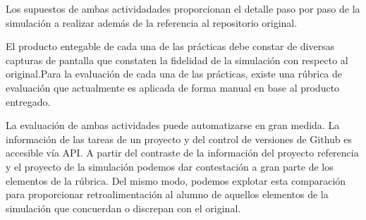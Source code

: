 Los supuestos de ambas actividadades proporcionan el  detalle paso por paso de la simulación a realizar además de la referencia al repositorio original. 


El producto entegable de cada una de las prácticas debe constar de diversas capturas de pantalla que constaten la fidelidad de la simulación con respecto al original.Para la evaluación de cada una de las prácticas, existe una rúbrica de evaluación que actualmente es aplicada de forma manual en base al producto entregado.


La evaluación de ambas actividades puede automatizarse en gran medida. La información de las tareas de un proyecto y del control de versiones de Github es accesible vía API. A partir del contraste de la información del proyecto referencia y el proyecto de la simulación podemos dar contestación a gran parte de los elementos de la rúbrica. Del mismo modo, podemos explotar esta comparación para proporcionar retroalimentación al alumno de aquellos elementos de la simulación que concuerdan o discrepan con el original.